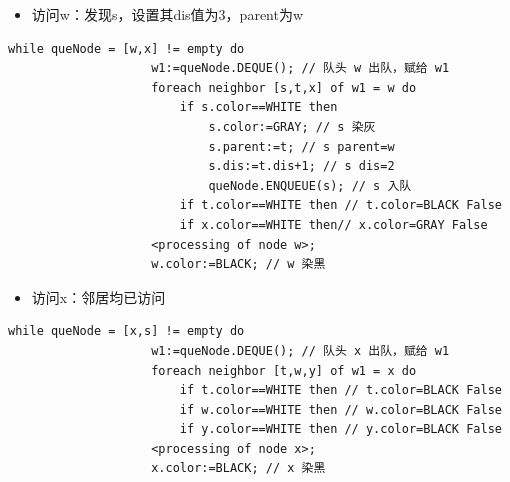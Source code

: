 \documentclass{article}
\begin{document}
\begin{enumerate}
    \begin{itemize}
        \item 访问w：发现s，设置其dis值为3，parent为w
    \end{itemize}

    \begin{lstlisting}[style=algorithmPPT]
                while queNode = [w,x] != empty do
                    w1:=queNode.DEQUE(); // 队头 w 出队，赋给 w1
                    foreach neighbor [s,t,x] of w1 = w do
                        if s.color==WHITE then
                            s.color:=GRAY; // s 染灰
                            s.parent:=t; // s parent=w
                            s.dis:=t.dis+1; // s dis=2
                            queNode.ENQUEUE(s); // s 入队
                        if t.color==WHITE then // t.color=BLACK False
                        if x.color==WHITE then// x.color=GRAY False
                    <processing of node w>;
                    w.color:=BLACK; // w 染黑
                \end{lstlisting}    
    \begin{itemize}
        \item 访问x：邻居均已访问
    \end{itemize}


    \begin{lstlisting}[style=algorithmPPT]
                while queNode = [x,s] != empty do
                    w1:=queNode.DEQUE(); // 队头 x 出队，赋给 w1
                    foreach neighbor [t,w,y] of w1 = x do 
                        if t.color==WHITE then // t.color=BLACK False
                        if w.color==WHITE then // w.color=BLACK False
                        if y.color==WHITE then // y.color=BLACK False
                    <processing of node x>;
                    x.color:=BLACK; // x 染黑        
                \end{lstlisting}  
    \begin{figure}[htbp]
        \begin{minipage}[b]{0.6\textwidth}    %
            \centering
                \begin{tikzpicture}[
                    scale=1.5,
                    node distance=2.5cm,
                    every node/.style={
                        circle, 
                        draw, 
                        minimum size=2em,
                        inner sep=4pt,
                        font=\large
                    }
                ]
                    

\end{tikzpicture}
\end{minipage}
\end{figure}
\end{enumerate}
\end{document}
